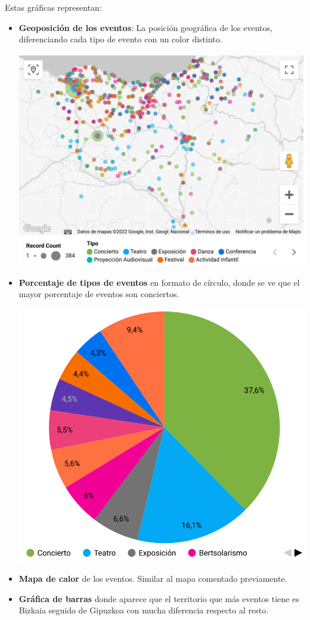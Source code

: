\documentclass{\ClassPath/viu-tfm-template}
\begin{document}
Estas gráficas representan:
\begin{itemize}
    \item \textbf{Geoposición de los eventos}: La posición geográfica de los eventos, diferenciando cada tipo de evento con un color distinto.
    \begin{center}
        \includegraphics[width=0.6\linewidth]{img/mapa1.png}
    \end{center}

    \item \textbf{Porcentaje de tipos de eventos} en formato de círculo, donde se ve que el mayor porcentaje de eventos son conciertos.
    \begin{center}
        \includegraphics[width=0.6\linewidth]{img/circulo.png}
    \end{center}

    \item \textbf{Mapa de calor} de los eventos. Similar al mapa comentado previamente.

    \item \textbf{Gráfica de barras} donde aparece que el territorio que más eventos tiene es Bizkaia seguido de Gipuzkoa con mucha diferencia respecto al resto.
\end{itemize}
\end{document}
